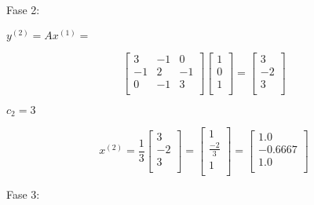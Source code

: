 Fase 2: 

\begin{center} 
$y^{(2)} = Ax^{(1)} =$
\end{center}
\[
  \left[ {\begin{array}{ccc}
   3 & -1 & 0 \\
   -1 & 2 & -1 \\
   0 & -1 & 3 \\
  \end{array} } \right]
  \left[ {\begin{array}{c}
   1  \\
   0 \\
   1  \\
  \end{array} } \right]
  = 
    \left[ {\begin{array}{c}
   3  \\
   -2 \\
   3 \\
  \end{array} } \right]
\]
\begin{center} 
$c_2 = 3$ 


\[
x^{(2)} = \frac{1}{3} 
  \left[ {\begin{array}{c}
   3  \\
   -2 \\
   3 \\
  \end{array} } \right]
  =
  \left[ {\begin{array}{c}
   1  \\
   \frac{-2}{3} \\
   1 \\
  \end{array} } \right]
  =
    \left[ {\begin{array}{c}
   1.0  \\
   -0.6667 \\
   1.0 \\
  \end{array} } \right]
\]

\end{center}


Fase 3: 

